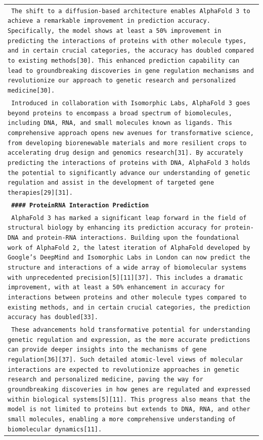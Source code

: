 \begin{longtable}{p{\textwidth}}
\texttt{\small{ The shift to a diffusion-based architecture enables AlphaFold 3 to achieve a remarkable improvement in prediction accuracy. Specifically, the model shows at least a 50\% improvement in predicting the interactions of proteins with other molecule types, and in certain crucial categories, the accuracy has doubled compared to existing methods[30]. This enhanced prediction capability can lead to groundbreaking discoveries in gene regulation mechanisms and revolutionize our approach to genetic research and personalized medicine[30]. }} \\
\texttt{\small{ Introduced in collaboration with Isomorphic Labs, AlphaFold 3 goes beyond proteins to encompass a broad spectrum of biomolecules, including DNA, RNA, and small molecules known as ligands. This comprehensive approach opens new avenues for transformative science, from developing biorenewable materials and more resilient crops to accelerating drug design and genomics research[31]. By accurately predicting the interactions of proteins with DNA, AlphaFold 3 holds the potential to significantly advance our understanding of genetic regulation and assist in the development of targeted gene therapies[29][31]. }} \\
\vspace{1pt}
\texttt{\small{\textbf{ \#\#\#\# ProteinRNA Interaction Prediction }}} \\
\texttt{\small{ AlphaFold 3 has marked a significant leap forward in the field of structural biology by enhancing its prediction accuracy for protein-DNA and protein-RNA interactions. Building upon the foundational work of AlphaFold 2, the latest iteration of AlphaFold developed by Google's DeepMind and Isomorphic Labs in London can now predict the structure and interactions of a wide array of biomolecular systems with unprecedented precision[5][11][37]. This includes a dramatic improvement, with at least a 50\% enhancement in accuracy for interactions between proteins and other molecule types compared to existing methods, and in certain crucial categories, the prediction accuracy has doubled[33]. }} \\
\texttt{\small{ These advancements hold transformative potential for understanding genetic regulation and expression, as the more accurate predictions can provide deeper insights into the mechanisms of gene regulation[36][37]. Such detailed atomic-level views of molecular interactions are expected to revolutionize approaches in genetic research and personalized medicine, paving the way for groundbreaking discoveries in how genes are regulated and expressed within biological systems[5][11]. This progress also means that the model is not limited to proteins but extends to DNA, RNA, and other small molecules, enabling a more comprehensive understanding of biomolecular dynamics[11]. }} \\

\end{longtable}
